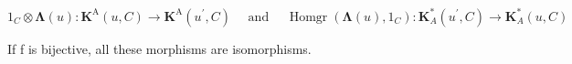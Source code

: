 \[
1 _ {C} \otimes \boldsymbol {\Lambda} (u): \mathbf {K} ^ {\mathrm{A}} (u, C) \rightarrow \mathbf {K} ^ {\mathrm{A}} \left(u ^ {\prime}, C\right) \quad \text { and }\quad \operatorname{Homgr} \left(\boldsymbol {\Lambda} (u), 1 _ {C}\right): \mathbf {K} _ {A} ^ {*} \left(u ^ {\prime}, C\right)\rightarrow \mathbf {K} _ {A} ^ {*} (u, C)
\]

If f is bijective, all these morphisms are isomorphisms.

